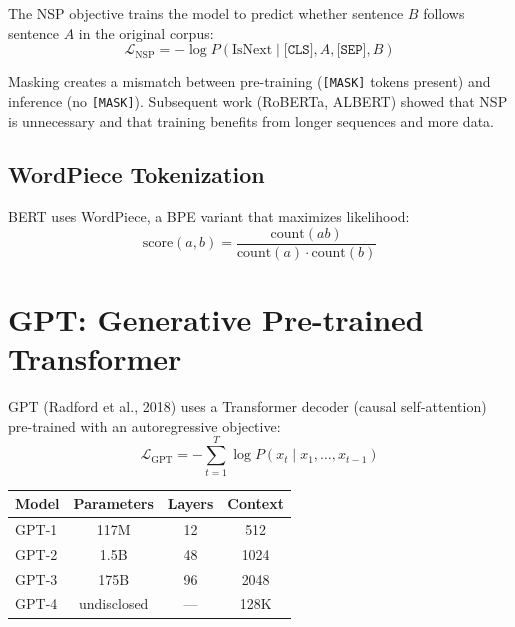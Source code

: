 \begin{definition}
The NSP objective trains the model to predict whether sentence $B$ follows
sentence $A$ in the original corpus:
\[
\mathcal{L}_{\text{NSP}} = -\log P(\text{IsNext} \mid \texttt{[CLS]}, A, \texttt{[SEP]}, B)
\]
\end{definition}

\begin{warning}[title=\textbf{MLM limitations}]
Masking creates a mismatch between pre-training (\texttt{[MASK]} tokens present)
and inference (no \texttt{[MASK]}). Subsequent work (RoBERTa, ALBERT) showed
that NSP is unnecessary and that training benefits from longer sequences and
more data.
\end{warning}

\subsection{WordPiece Tokenization}

BERT uses WordPiece, a BPE variant that maximizes likelihood:
\[
\text{score}(a, b) = \frac{\text{count}(ab)}{\text{count}(a) \cdot \text{count}(b)}
\]

\section{GPT: Generative Pre-trained Transformer}
\label{sec:pre:gpt}

\begin{definition}[GPT]
GPT (Radford et al., 2018) uses a Transformer decoder (causal self-attention)
pre-trained with an autoregressive objective:
\[
\mathcal{L}_{\text{GPT}} = -\sum_{t=1}^{T} \log P(x_t \mid x_1, \ldots, x_{t-1})
\]
\end{definition}

\begin{center}
\begin{tabular}{lccc}
\toprule
\textbf{Model} & \textbf{Parameters} & \textbf{Layers} & \textbf{Context} \\
\midrule
GPT-1 & 117M & 12 & 512 \\
GPT-2 & 1.5B & 48 & 1024 \\
GPT-3 & 175B & 96 & 2048 \\
GPT-4 & undisclosed & --- & 128K \\
\bottomrule
\end{tabular}
\end{center}

